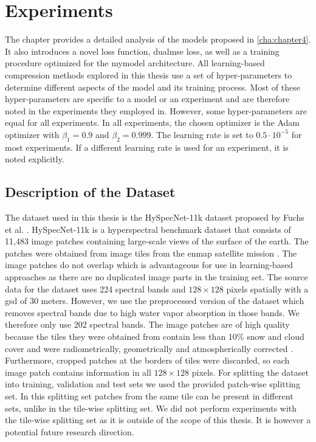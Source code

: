 \chapter{Experiments\label{cha:chapter5}}
The chapter provides a detailed analysis of the models proposed in \autoref{cha:chapter4}. It also introduces a novel loss function, \ac{dualmse} loss, as well as a training procedure optimized for the \ac{mymodel} architecture. All learning-based compression methods explored in this thesis use a set of hyper-parameters to determine different aspects of the model and its training process. Most of these hyper-parameters are specific to a model or an experiment and are therefore noted in the experiments they employed in. However, some hyper-parameters are equal for all experiments. In all experiments, the chosen optimizer is the Adam optimizer with $\beta_1=0.9$ and $\beta_2=0.999$. The learning rate is set to $0.5 \cdot 10^{-5}$ for most experiments. If a different learning rate is used for an experiment, it is noted explicitly.

\section{Description of the Dataset\label{sec:dataset}}
The dataset used in this thesis is the HySpecNet-11k dataset proposed by Fuchs et al. \citep{fuchs_hyspecnet-11k_2023}. HySpecNet-11k is a hyperspectral benchmark dataset that consists of 11,483 image patches containing large-scale views of the surface of the earth. The patches were obtained from image tiles from the \ac{enmap} satellite mission \citep{guanter_enmap_2015}. The image patches do not overlap which is advantageous for use in learning-based approaches as there are no duplicated image parts in the training set. The source data for the dataset uses 224 spectral bands and $128\times 128$ pixels spatially with a \ac{gsd} of 30 meters. However, we use the preprocessed version of the dataset which removes spectral bands due to high water vapor absorption in those bands. We therefore only use 202 spectral bands. The image patches are of high quality because the tiles they were obtained from contain less than 10\% snow and cloud cover and were radiometrically, geometrically and atmospherically corrected \citep{fuchs_hyspecnet-11k_2023}. Furthermore, cropped patches at the borders of tiles were discarded, so each image patch contains information in all $128\times 128$ pixels. For splitting the dataset into training, validation and test sets we used the provided patch-wise splitting set. In this splitting set patches from the same tile can be present in different sets, unlike in the tile-wise splitting set. We did not perform experiments with the tile-wise splitting set as it is outside of the scope of this thesis. It is however a potential future research direction.

